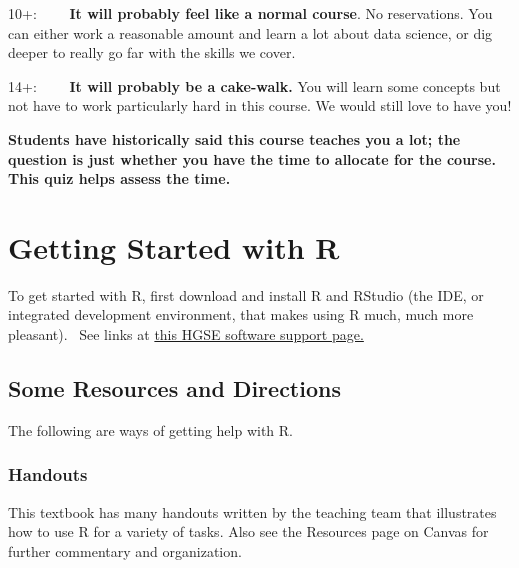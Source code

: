 \documentclass[
  letterpaper,
  DIV=11,
  numbers=noendperiod]{scrreprt}
\begin{document}
10+:~~~~ \textbf{It will probably feel like a normal course}. No
reservations. You can either work a reasonable amount and learn a lot
about data science, or dig deeper to really go far with the skills we
cover.

14+:~~~~ \textbf{It will probably be a cake-walk.} You will learn some
concepts but not have to work particularly hard in this course. We would
still love to have you!

\textbf{Students have historically said this course teaches you a lot;
the question is just whether you have the time to allocate for the
course. This quiz helps assess the time.}


\hypertarget{getting-started-with-r}{%
\chapter*{Getting Started with R}\label{getting-started-with-r}}


To get started with R, first download and install R and RStudio (the
IDE, or integrated development environment, that makes using R much,
much more pleasant).~ See links at
\href{https://its.gse.harvard.edu/research-software-support}{this HGSE
software support page.}

\hypertarget{some-resources-and-directions}{%
\section*{Some Resources and
Directions}\label{some-resources-and-directions}}


The following are ways of getting help with R.

\hypertarget{handouts}{%
\subsection*{Handouts}\label{handouts}}

This textbook has many handouts written by the teaching team that
illustrates how to use R for a variety of tasks. Also see the Resources
page on Canvas for further commentary and organization.
\end{document}
